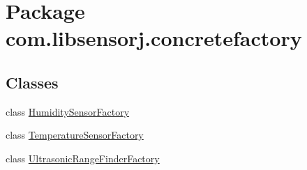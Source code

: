 \hypertarget{namespacecom_1_1libsensorj_1_1concretefactory}{}\section{Package com.\+libsensorj.\+concretefactory}
\label{namespacecom_1_1libsensorj_1_1concretefactory}
\subsection*{Classes}
\begin{DoxyCompactItemize}
\item 
class \hyperlink{classcom_1_1libsensorj_1_1concretefactory_1_1HumiditySensorFactory}{Humidity\+Sensor\+Factory}
\item 
class \hyperlink{classcom_1_1libsensorj_1_1concretefactory_1_1TemperatureSensorFactory}{Temperature\+Sensor\+Factory}
\item 
class \hyperlink{classcom_1_1libsensorj_1_1concretefactory_1_1UltrasonicRangeFinderFactory}{Ultrasonic\+Range\+Finder\+Factory}
\end{DoxyCompactItemize}
